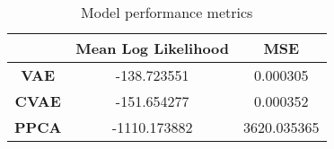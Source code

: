 \begin{table}
\centering
\caption{Model performance metrics}
\label{table:metrics}
\begin{tabular}{ccc}
\toprule
{} &  \textbf{Mean Log Likelihood} &  \textbf{MSE} \\
\midrule
\textbf{VAE } &                   -138.723551 &      0.000305 \\
\textbf{CVAE} &                   -151.654277 &      0.000352 \\
\textbf{PPCA} &                  -1110.173882 &   3620.035365 \\
\bottomrule
\end{tabular}
\end{table}

